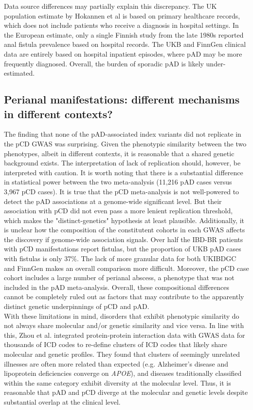 Data source differences may partially explain this discrepancy. The UK population estimate by Hokannen et al is based on primary healthcare records, which does not include patients who receive a diagnosis in hospital settings. In the European estimate, only a single Finnish study from the late 1980s reported anal fistula prevalence based on hospital records. The UKB and FinnGen clinical data are entirely based on hospital inpatient episodes, where pAD may be more frequently diagnosed. Overall, the burden of sporadic pAD is likely under-estimated. \\

\subsection{Perianal manifestations: different mechanisms in different contexts?}
The finding that none of the pAD-associated index variants did not replicate in the pCD GWAS was surprising. Given the phenotypic similarity between the two phenotypes, albeit in different contexts, it is reasonable that a shared genetic background exists. The interpretation of lack of replication should, however, be interpreted with caution. It is worth noting that there is a substantial difference in statistical power between the two meta-analysis (11,216 pAD cases versus 3,967 pCD cases). It is true that the pCD meta-analysis is not well-powered to detect the pAD associations at a genome-wide significant level. But their association with pCD did not even pass a more lenient replication threshold, which makes the "distinct-genetics" hypothesis at least plausible. Additionally, it is unclear how the composition of the constitutent cohorts in each GWAS affects the discovery if genome-wide association signals. Over half the IBD-BR patients with pCD manifestations report fistulas, but the proportion of UKB pAD cases with fistulas is only 37\%. The lack of more granular data for both UKIBDGC and FinnGen makes an overall comparison more difficult. Moreover, the pCD case cohort includes a large number of perianal abscess, a phenotype that was not included in the pAD meta-analysis. Overall, these compositional differences cannot be completely ruled out as factors that may contribute to the apparently distinct genetic underpinnings of pCD and pAD.\\


With these limitations in mind, disorders that exhibit phenotypic similarity do not always share molecular and/or genetic similarity and vice versa. In line with this, Zhou et al. \cite{Zhou2018-tp} integrated protein-protein interaction data with GWAS data for thousands of ICD codes to re-define clusters of ICD codes that likely share molecular and genetic profiles. They found that clusters of seemingly unrelated illnesses are often more related than expected (e.g. Alzheimer's disease and lipoprotein deficiencies converge on \textit{APOE}), and diseases traditionally classified within the same category exhibit diversity at the molecular level. Thus, it is reasonable that pAD and pCD diverge at the molecular and genetic levels despite substantial overlap at the clinical level. 

